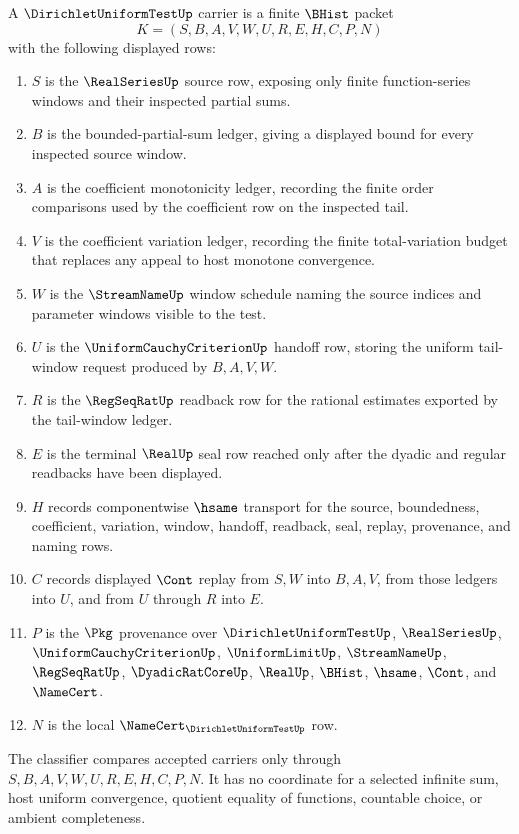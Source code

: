 \begin{definition}
\label{def:dirichlet-uniform-test-carrier}
A $\DirichletUniformTestUp$ carrier is a finite $\BHist$ packet
$$
K=(S,B,A,V,W,U,R,E,H,C,P,N)
$$
with the following displayed rows:
\begin{enumerate}
\item $S$ is the $\RealSeriesUp$ source row, exposing only finite function-series windows and their inspected partial sums.
\item $B$ is the bounded-partial-sum ledger, giving a displayed bound for every inspected source window.
\item $A$ is the coefficient monotonicity ledger, recording the finite order comparisons used by the coefficient row on the inspected tail.
\item $V$ is the coefficient variation ledger, recording the finite total-variation budget that replaces any appeal to host monotone convergence.
\item $W$ is the $\StreamNameUp$ window schedule naming the source indices and parameter windows visible to the test.
\item $U$ is the $\UniformCauchyCriterionUp$ handoff row, storing the uniform tail-window request produced by $B,A,V,W$.
\item $R$ is the $\RegSeqRatUp$ readback row for the rational estimates exported by the tail-window ledger.
\item $E$ is the terminal $\RealUp$ seal row reached only after the dyadic and regular readbacks have been displayed.
\item $H$ records componentwise $\hsame$ transport for the source, boundedness, coefficient, variation, window, handoff, readback, seal, replay, provenance, and naming rows.
\item $C$ records displayed $\Cont$ replay from $S,W$ into $B,A,V$, from those ledgers into $U$, and from $U$ through $R$ into $E$.
\item $P$ is the $\Pkg$ provenance over $\DirichletUniformTestUp$, $\RealSeriesUp$, $\UniformCauchyCriterionUp$, $\UniformLimitUp$, $\StreamNameUp$, $\RegSeqRatUp$, $\DyadicRatCoreUp$, $\RealUp$, $\BHist$, $\hsame$, $\Cont$, and $\NameCert$.
\item $N$ is the local $\NameCert_{\DirichletUniformTestUp}$ row.
\end{enumerate}
The classifier compares accepted carriers only through $S,B,A,V,W,U,R,E,H,C,P,N$. It has no coordinate for a selected infinite sum, host uniform convergence, quotient equality of functions, countable choice, or ambient completeness.
\end{definition}


